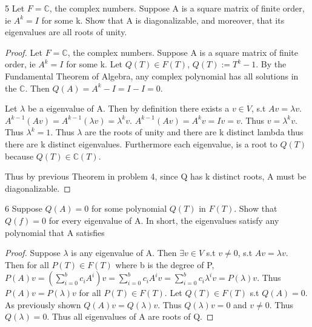 \documentclass{article}
\newcommand{\C}{\mathbb{C}}
\begin{document}
\bigskip
\begin{PROB}{5}\label{Problem 5.}
    Let $F = \C$, the complex numbers. Suppose A is a square matrix of finite order, ie $A^k =I$ for some k. Show that A is diagonalizable, and moreover, that its eigenvalues are all roots of unity. 
\end{PROB}
\begin{proof}
    Let $F = \C$, the complex numbers. Suppose A is a square matrix of finite order, ie $A^k =I$ for some k. Let $Q(T) \in F(T)$, $Q(T):=T^k - 1$. By the Fundamental Theorem of Algebra, any complex polynomial has all solutions in the $\C$. Then $Q(A) = A^k - I = I - I = 0$.

    Let $\lambda$ be a eigenvalue of A. Then by definition there exists a $v \in V$, s.t $Av = \lambda v$. $A^{k - 1}(Av) = A^{k - 1}(\lambda v) = \lambda^k v$. $A^{k - 1}(Av) = A^k v = Iv = v$. Thus $v = \lambda^k v$. Thus $\lambda^k = 1$. Thus $\lambda$ are the roots of unity and there are k distinct lambda thus there are k distinct eigenvalues. Furthermore each eigenvalue, is a root to $Q(T)$ because $Q(T) \in \C(T)$.

    Thus by previous Theorem in problem 4, since Q has k distinct roots, A must be diagonalizable.
\end{proof}

\bigskip

\begin{PROB}{6}\label{Problem 6.}
    Suppose $Q(A)=0$ for some polynomial $Q(T)$ in $F(T)$. Show that $Q(f) = 0$ for every eigenvalue of A. In short, the eigenvalues satisfy any polynomial that A satisfies
\end{PROB}
\begin{proof}


    Suppose $\lambda$ is any eigenvalue of A. Then $\exists v \in V$ s.t $v \neq 0$, s.t $Av = \lambda v$. Then for all $P(T) \in F(T)$ where b is the degree of P, $P(A)v = (\sum_{i=0}^{b}c_i A^i)v = \sum_{i=0}^{b}c_i A^iv = \sum_{i=0}^{b} c_i \lambda^i v = P(\lambda)v$. Thus $P(A)v = P(\lambda)v$ for all $P(T) \in F(T)$. Let $Q(T) \in F(T)$ s.t $Q(A) = 0$. As previously shown $Q(A)v = Q(\lambda)v$. Thus $Q(\lambda)v = 0$ and $v \neq 0$. Thus $Q(\lambda) = 0$. Thus all eigenvalues of A are roots of Q.
\end{proof}
\end{document}
